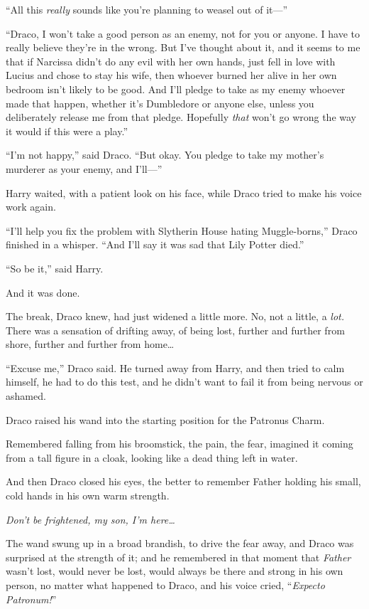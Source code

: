 “All this \emph{really} sounds like you’re planning to weasel out of it—”

“Draco, I won’t take a good person as an enemy, not for you or anyone. I have to really believe they’re in the wrong. But I’ve thought about it, and it seems to me that if Narcissa didn’t do any evil with her own hands, just fell in love with Lucius and chose to stay his wife, then whoever burned her alive in her own bedroom isn’t likely to be good. And I’ll pledge to take as my enemy whoever made that happen, whether it’s Dumbledore or anyone else, unless you deliberately release me from that pledge. Hopefully \emph{that} won’t go wrong the way it would if this were a play.”

“I’m not happy,” said Draco. “But okay. You pledge to take my mother’s murderer as your enemy, and I’ll—”

Harry waited, with a patient look on his face, while Draco tried to make his voice work again.

“I’ll help you fix the problem with Slytherin House hating Muggle-borns,” Draco finished in a whisper. “And I’ll say it was sad that Lily Potter died.”

“So be it,” said Harry.

And it was done.

The break, Draco knew, had just widened a little more. No, not a little, a \emph{lot.} There was a sensation of drifting away, of being lost, further and further from shore, further and further from home…

“Excuse me,” Draco said. He turned away from Harry, and then tried to calm himself, he had to do this test, and he didn’t want to fail it from being nervous or ashamed.

Draco raised his wand into the starting position for the Patronus Charm.

Remembered falling from his broomstick, the pain, the fear, imagined it coming from a tall figure in a cloak, looking like a dead thing left in water.

And then Draco closed his eyes, the better to remember Father holding his small, cold hands in his own warm strength.

\emph{Don’t be frightened, my son, I’m here…}

The wand swung up in a broad brandish, to drive the fear away, and Draco was surprised at the strength of it; and he remembered in that moment that \emph{Father} wasn’t lost, would never be lost, would always be there and strong in his own person, no matter what happened to Draco, and his voice cried, “\emph{Expecto Patronum!}”

